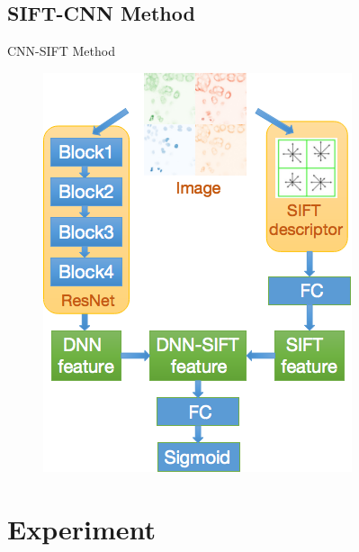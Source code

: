 \documentclass[unknownkeysallowed]{beamer}
\begin{document}
	\subsection{SIFT-CNN Method}
	\begin{frame}
	\begin{block}{CNN-SIFT Method}
		\begin{figure}\includegraphics[width=0.5\paperwidth,height=0.8\paperheight]{images/dnn_sift_framework}
		\end{figure}
	\end{block}
	\end{frame}
	
	\section{Experiment}
\end{document}
